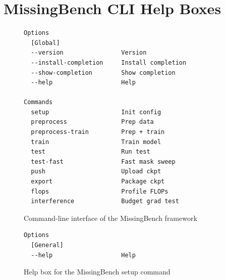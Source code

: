 \documentclass{article}
\begin{document}
\section*{MissingBench CLI Help Boxes}
  
\begin{figure}[h]
\centering
\begin{tcolorbox}[
  colback=lightgreenbg,
  colframe=lightgreenframe,
  arc=2mm,
  boxrule=0.6pt,
  title=MissingBench CLI,
  fonttitle=\bfseries
]
\begin{Verbatim}[breaklines=true,breakanywhere=true,fontsize=\small]
Options
  [Global]
  --version                Version
  --install-completion     Install completion
  --show-completion        Show completion
  --help                   Help

Commands
  setup                    Init config
  preprocess               Prep data
  preprocess-train         Prep + train
  train                    Train model
  test                     Run test
  test-fast                Fast mask sweep
  push                     Upload ckpt
  export                   Package ckpt
  flops                    Profile FLOPs
  interference             Budget grad test
\end{Verbatim}
\end{tcolorbox}
\caption{Command-line interface of the MissingBench framework}
\label{fig:missingbench_cli}
\end{figure}

\begin{figure}[h]
\centering
\begin{tcolorbox}[
  colback=lightgreenbg,
  colframe=lightgreenframe,
  arc=2mm,
  boxrule=0.6pt,
  title=MissingBench setup,
  fonttitle=\bfseries
]
\begin{Verbatim}[breaklines=true,breakanywhere=true,fontsize=\small]
Options
  [General]
  --help                   Help
\end{Verbatim}
\end{tcolorbox}
\caption{Help box for the MissingBench setup command}
\label{fig:missingbench_setup}
\end{figure}
\end{document}
